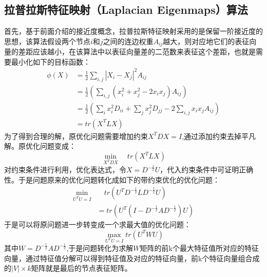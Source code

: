 \subsection{拉普拉斯特征映射（Laplacian Eigenmaps）算法}
首先，基于前面介绍的接近度概念，拉普拉斯特征映射采用的是保留一阶接近度的思想，该算法假设两个节点$i$和$j$之间的连边权重$A_{ij}$越大，则对应地它们的表征向量的差距应该越小，在该算法中以表征向量差的二范数来表征这个差距，也就是需要最小化如下的目标函数：
\begin{equation}
\begin{aligned}
\phi(X) &= \frac{1}{2}\sum_{i,j}|X_i - X_j|^2A_{ij} \\
&= \frac{1}{2}(\sum_{i,j}(x_i^2+x_j^2-2x_ix_j) A_{ij}) \\
&=\frac{1}{2} (\sum_ix_i^2D_{ii} +\sum_j x_j^2 D_{jj} - 2\sum_{i,j}x_i x_j A_{ij}) \\
&= tr(X^TLX)
\end{aligned}
\end{equation}
为了得到合理的解，原优化问题需要增加约束$X^TDX=I$,通过添加约束去掉平凡解。原优化问题变成：
\begin{equation}
\min_{X^TDX} \quad tr(X^TLX)
\end{equation}
对约束条件进行利用，优化表达式，令$X=D^{-\frac{1}{2}}U$，代入约束条件中可证明正确性。于是问题原来的优化问题转化成如下的带约束优化的优化问题：
\begin{equation}\label{laplacian_reduce}
\begin{aligned}
\min_{U^TU = I} &\quad tr(U^TD^{-\frac{1}{2}}LD^{-\frac{1}{2}}U) \\
&= tr(U^T(I-D^{-\frac{1}{2}}AD^{-\frac{1}{2}})U)
\end{aligned}
\end{equation}
于是可以将原问题进一步转变成一个求最大值的优化问题：
\begin{equation}
\max_{U^TU = I} tr(U^TWU)
\end{equation}
其中$W = D^{-\frac{1}{2}}AD^{-\frac{1}{2}} $,于是问题转化为求解$W$矩阵的前k个最大特征值所对应的特征向量，通过特征值分解可以得到特征值及对应的特征向量，前k个特征向量组合成的$|V|\times k$矩阵就是最后的节点表征矩阵。

